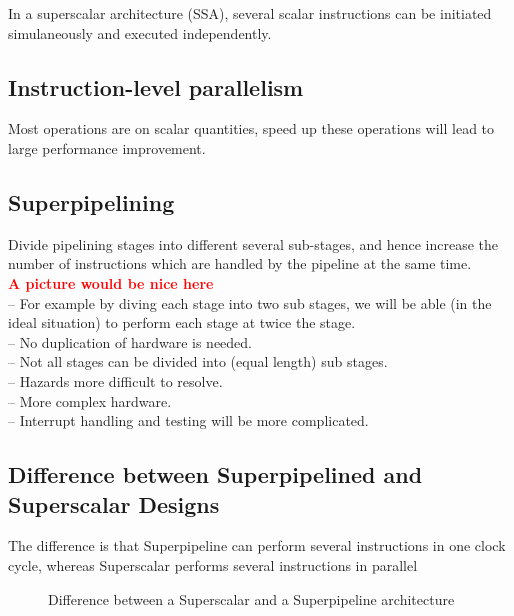 \documentclass[titlepage, a4paper]{article}
\newcommand{\todo}[1] {\textbf{\textcolor{red}{#1}}}
\begin{document}
In a superscalar architecture (SSA), several scalar instructions can be initiated simulaneously and executed independently.

\subsection{Instruction-level parallelism}
Most operations are on scalar quantities, speed up these operations will lead to large performance improvement.

\subsection{Superpipelining}
Divide pipelining stages into different several sub-stages, and hence increase the number of instructions which are handled by the pipeline at the same time. \\
\todo{A picture would be nice here} \\

-- For example by diving each stage into two sub stages, we will be able (in the ideal situation) to perform each stage at twice the stage. \\
-- No duplication of hardware is needed. \\
-- Not all stages can be divided into (equal length) sub stages. \\
-- Hazards more difficult to resolve. \\
-- More complex hardware. \\
-- Interrupt handling and testing will be more complicated. \\

\subsection{Difference between Superpipelined and Superscalar Designs}
The difference is that Superpipeline can perform several instructions in one clock cycle, whereas Superscalar performs several instructions in parallel

\begin{figure}[H]
  \centering
  \caption{Difference between a Superscalar and a Superpipeline architecture}
  \label{fig:superscalar-vs-superpipeline}
\end{figure}
\end{document}
